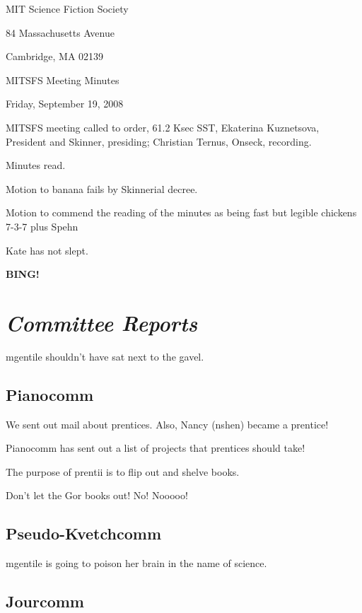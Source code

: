 \documentclass[10pt]{article}
\newcommand{\bing}{{\bf BING!} }
\newcommand{\goto}[1]{\bing \vskip 12pt \section*{{\em{#1}}}}
\newcommand{\ps}{ plus Spehn\xspace}
\begin{document}
\begin{center}

MIT Science Fiction Society

84 Massachusetts Avenue

Cambridge, MA 02139

\vspace{12pt}

MITSFS Meeting Minutes

Friday, September 19, 2008

\end{center}

\vspace{18pt}

\setlength{\parskip}{6pt}

\noindent
MITSFS meeting called to order, 61.2 Ksec SST,
Ekaterina Kuznetsova, President and Skinner, presiding; Christian Ternus, Onseck, recording.

Minutes read.

Motion to banana fails by Skinnerial decree.

Motion to commend the reading of the minutes as being fast but legible chickens 7-3-7 \ps

Kate has not slept.

\BING

\goto{Committee Reports}

mgentile shouldn't have sat next to the gavel.

\subsection*{Pianocomm}

We sent out mail about prentices.  Also, Nancy (nshen) became a prentice!

Pianocomm has sent out a list of projects that prentices should take!

The purpose of prentii is to flip out and shelve books.

Don't let the Gor books out!  No!  Nooooo!

\subsection*{Pseudo-Kvetchcomm}

mgentile is going to poison her brain in the name of science.

\subsection*{Jourcomm}
\end{document}
